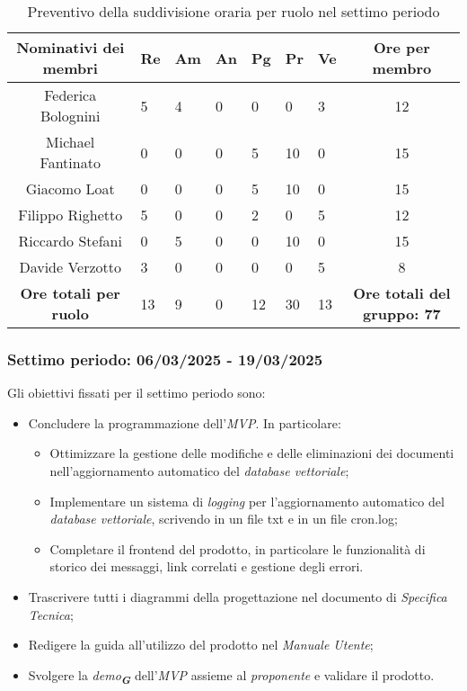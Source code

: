 \begin{table}[h!]
    \centering
    \renewcommand{\arraystretch}{1.5}
    \begin{tabularx}{\textwidth}{|c|X|X|X|X|X|X|c|}\hline
    \rowcolor[HTML]{FFD700} 
    \textbf{Nominativi dei membri} & \textbf{Re} & \textbf{Am} & \textbf{An} & \textbf{Pg} & \textbf{Pr} & \textbf{Ve} & \textbf{Ore per membro} \\ \hline
    Federica Bolognini  & 5 & 4 & 0 & 0 & 0 & 3 & 12 \\ \hline
    Michael Fantinato   & 0 & 0 & 0 & 5 & 10 & 0 & 15 \\ \hline
    Giacomo Loat        & 0 & 0 & 0 & 5 & 10 & 0 & 15 \\ \hline
    Filippo Righetto    & 5 & 0 & 0 & 2 & 0 & 5 & 12 \\ \hline
    Riccardo Stefani    & 0 & 5 & 0 & 0 & 10 & 0 & 15 \\ \hline
    Davide Verzotto     & 3 & 0 & 0 & 0 & 0 & 5 & 8 \\ \hline
    \rowcolor[HTML]{FFD700} 
    \textbf{Ore totali per ruolo} & 13 & 9 & 0 & 12 & 30 & 13 & \textbf{Ore totali del gruppo: 77} \\ \hline
    \end{tabularx}
    \caption{Preventivo della suddivisione oraria per ruolo nel settimo periodo}
\end{table}


\newpage
\subsubsection{Settimo periodo: 06/03/2025 - 19/03/2025}
\label{sec:prev_cons_settimo_periodo}  
Gli obiettivi fissati per il settimo periodo sono:
\begin{itemize}
    \item Concludere la programmazione dell'\emph{MVP}. In particolare:
    \begin{itemize}
        \item Ottimizzare la gestione delle modifiche e delle eliminazioni dei documenti nell'aggiornamento automatico del \emph{database vettoriale};
        \item Implementare un sistema di \emph{logging} per l'aggiornamento automatico del \emph{database vettoriale}, scrivendo in un file txt e in un file cron.log;
        \item Completare il frontend del prodotto, in particolare le funzionalità di storico dei messaggi, link correlati e gestione degli errori.
    \end{itemize}
    \item Trascrivere tutti i diagrammi della progettazione nel documento di \emph{Specifica Tecnica};
    \item Redigere la guida all'utilizzo del prodotto nel \emph{Manuale Utente};
    \item Svolgere la \emph{demo}\textsubscript{\textbf{\textit{G}}} dell'\emph{MVP} assieme al \emph{proponente} e validare il prodotto.
\end{itemize}

